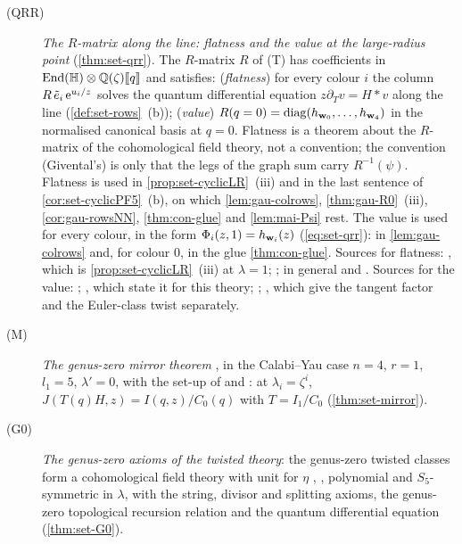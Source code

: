 \begin{description}
\item[(QRR)] \emph{The $R$-matrix along the line: flatness and the value at the large-radius point} (\cref{thm:set-qrr}). The $R$-matrix $R$ of (T) has coefficients in $\operatorname{End}(\mathbb{H})\otimes\mathbb{Q}(\zeta)[\![ q ]\!]$ and satisfies: (\emph{flatness}) for every colour $i$ the column $R\,\tilde e_i\,\mathrm{e}^{u_i/z}$ solves the quantum differential equation $z\partial_Tv=H*v$ along the line (\cref{def:set-rows}~(b)); (\emph{value}) $R(q=0)=\operatorname{diag}(h_{\mathbf{w}_0},\dots,h_{\mathbf{w}_4})$ in the normalised canonical basis at $q=0$. Flatness is a theorem about the $R$-matrix of the cohomological field theory, not a convention; the convention (Givental's) is only that the legs of the graph sum carry $R^{-1}(\psi)$. Flatness is used in \cref{prop:set-cyclicLR}~(iii) and in the last sentence of \cref{cor:set-cyclicPF5}~(b), on which \cref{lem:gau-colrows}, \cref{thm:gau-R0}~(iii), \cref{cor:gau-rowsNN}, \cref{thm:con-glue} and \cref{lem:mai-Psi} rest. The value is used for every colour, in the form $\Phi_i(z,1)=h_{\mathbf{w}_i}(z)$ (\cref{eq:set-qrr}): in \cref{lem:gau-colrows} and, for colour $0$, in the glue \cref{thm:con-glue}. Sources for flatness: \cite[Lemma~5.2, (16)]{GJR18}, which is \cref{prop:set-cyclicLR}~(iii) at $\lambda=1$; \cite[\S4.2, (12)--(13)]{GJR17}; in general \cite[Section~1, Proposition (a)--(c)]{Giv01} and \cite[Props.~7.7, 8.2~(ii), 8.4, 8.7~(ii)]{MR2917177}. Sources for the value: \cite[(17), in the proof of Lemma~5.2]{GJR18}; \cite[(19)--(20), in the proof of Lemma~4.6, at $t=0$]{GJR17}, which state it for this theory; \cite[\S2.2, Theorem~1 and the Remark after it]{Giv01}; \cite[Theorem~1, Corollary~1]{MR2276766}, which give the tangent factor and the Euler-class twist separately.
\item[(M)] \emph{The genus-zero mirror theorem} \cite[Theorem~11.6]{MR1408320}, in the Calabi--Yau case $n=4$, $r=1$, $l_1=5$, $\lambda'=0$, with the set-up of \cite[\S9]{MR1408320} and \cite[Prop.~11.4]{MR1408320}: at $\lambda_i=\zeta^i$, $J(T(q)H,z)=I(q,z)/C_0(q)$ with $T=I_1/C_0$ (\cref{thm:set-mirror}).
\item[(G0)] \emph{The genus-zero axioms of the twisted theory}: the genus-zero twisted classes form a cohomological field theory with unit for $\eta$ \cite[\S4.1]{GJR18}, \cite[Def.~0.3]{PPZ15}, polynomial and $S_5$-symmetric in $\lambda$, with the string, divisor and splitting axioms, the genus-zero topological recursion relation and the quantum differential equation \cite[\S5.2, the display before (14), of which (14) is the form in the $q$-direction]{GJR18} (\cref{thm:set-G0}).

\end{description}
